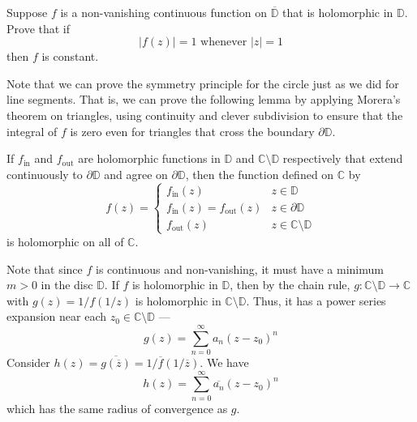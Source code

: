 \documentclass[12 pt, letterpaper]{hmcpset}
\begin{document}
\pagebreak

\begin{problem}[15]
	Suppose $f$ is a non-vanishing continuous function on $\overline{\mathbb{D}}$ that is holomorphic in $\mathbb{D}$. Prove that if
	\[
		\lvert f(z) \rvert = 1 \text{ whenever } \lvert z \rvert = 1
	\]
	then $f$ is constant.
\end{problem}

\begin{solution}
	Note that we can prove the symmetry principle for the circle just as we did for line segments. That is, we can prove the following lemma by applying Morera's theorem on triangles, using continuity and clever subdivision to ensure that the integral of $f$ is zero even for triangles that cross the boundary $\partial \mathbb{D}$.
	\begin{lemma}
		If $f_{\text{in}}$ and $f_{\text{out}}$ are holomorphic functions in $\mathbb{D}$ and $\mathbb{C} \setminus \mathbb{D}$ respectively that extend continuously to $\partial \mathbb{D}$ and agree on $\partial \mathbb{D}$, then the function defined on $\mathbb{C}$ by
		\[
			f(z) = \begin{cases}
				f_{\text{in}}(z) & z \in \mathbb{D} \\
				f_{\text{in}}(z) = f_{\text{out}}(z) & z \in \partial \mathbb{D} \\
				f_{\text{out}}(z) & z \in \mathbb{C} \setminus \mathbb{D}
			\end{cases}
		\]
		is holomorphic on all of $\mathbb{C}$.
	\end{lemma}

	Note that since $f$ is continuous and non-vanishing, it must have a minimum $m > 0$ in the disc $\mathbb{D}$. If $f$ is holomorphic in $\mathbb{D}$, then by the chain rule, $g : \mathbb{C} \setminus \mathbb{D \to \mathbb{C}}$ with $g(z) = 1/f(1 / z)$ is holomorphic in $\mathbb{C} \setminus \mathbb{D}$. Thus, it has a power series expansion near each $z_{0} \in \mathbb{C} \setminus \mathbb{D}$ ---
	\[
		g(z) = \sum_{n = 0}^{\infty} a_{n} (z - z_{0})^{n}
	\]
	Consider $h(z) = \overline{g(\overline{z})} = 1/\overline{f}(1 / \overline{z})$. We have
	\[
		h(z) = \sum_{n = 0}^{\infty} \overline{a_{n}} (z - z_{0})^{n}
	\]
	which has the same radius of convergence as $g$.


\end{solution}
\end{document}
